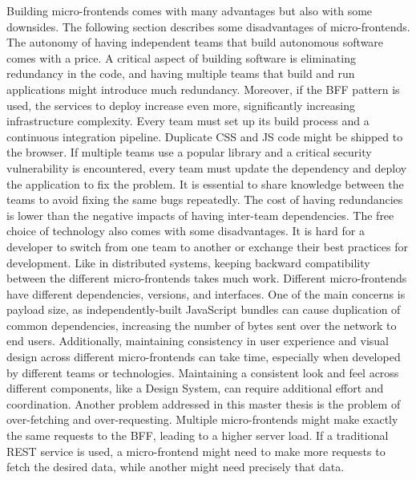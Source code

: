 Building micro-frontends comes with many advantages but also with some downsides. The following section describes some disadvantages of micro-frontends. The autonomy of having independent teams that build autonomous software comes with a price. A critical aspect of building software is eliminating redundancy in the code, and having multiple teams that build and run applications might introduce much redundancy. Moreover, if the \ac{BFF} pattern is used, the services to deploy increase even more, significantly increasing infrastructure complexity. Every team must set up its build process and a continuous integration pipeline. Duplicate \ac{CSS} and \ac{JS} code might be shipped to the browser. If multiple teams use a popular library and a critical security vulnerability is encountered, every team must update the dependency and deploy the application to fix the problem. It is essential to share knowledge between the teams to avoid fixing the same bugs repeatedly. The cost of having redundancies is lower than the negative impacts of having inter-team dependencies. The free choice of technology also comes with some disadvantages. It is hard for a developer to switch from one team to another or exchange their best practices for development. Like in distributed systems, keeping backward compatibility between the different micro-frontends takes much work. Different micro-frontends have different dependencies, versions, and interfaces.  \cite[17-18]{book:2020:geers:background:micro-frontends:micro-frontends-in-action} One of the main concerns is payload size, as independently-built JavaScript bundles can cause duplication of common dependencies, increasing the number of bytes sent over the network to end users. Additionally, maintaining consistency in user experience and visual design across different micro-frontends can take time, especially when developed by different teams or technologies. Maintaining a consistent look and feel across different components, like a Design System, can require additional effort and coordination. \cite{misc:2019:jackson:background:micro-frontends:disadvantages} Another problem addressed in this master thesis is the problem of over-fetching and over-requesting. Multiple micro-frontends might make exactly the same requests to the \ac{BFF}, leading to a higher server load. If a traditional \ac{REST} service is used, a micro-frontend might need to make more requests to fetch the desired data, while another might need precisely that data. 









